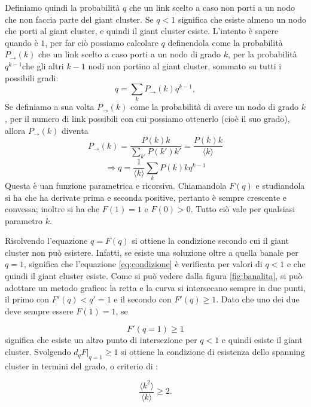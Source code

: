 Definiamo quindi la probabilit\`a $q$ che un link scelto a caso non porti a un nodo che non faccia parte del giant cluster. Se $q<1$ significa che esiste almeno un nodo che porti al giant cluster, e quindi il giant cluster esiste. L'intento \`e sapere quando \`e $1$, per far ci\`o possiamo calcolare $q$ definendola come la probabilit\`a $P_{\rightarrow}(k)$ che un link scelto a caso porti a un nodo di grado $k$, per la probabilit\`a $q^{k-1}$che gli altri $k-1$ nodi non portino al giant cluster, sommato su tutti i possibili gradi:
\begin{equation}
\label{eq:condizione}
	q = \sum_k P_{\rightarrow}(k) q^{k-1},
\end{equation}
Se definiamo a sua volta $P_{\rightarrow}(k)$ come la probabilit\`a di avere un nodo di grado $k$, per il numero di link possibili con cui possiamo ottenerlo (cio\`e il suo grado), allora $P_{\rightarrow}(k)$ diventa
\[P_{\rightarrow}(k) = \frac{P(k)k}{\sum_{k'}P(k')k'} = \frac{P(k)k}{\langle k \rangle}\]
\[\Rightarrow q = \frac{1}{\langle k \rangle}\sum_k P(k)kq^{k-1} \]
Questa \`e uan funzione parametrica e ricorsiva. Chiamandola $F(q)$ e studiandola si ha che ha derivate prima e seconda positive, pertanto \`e sempre crescente e convessa; inoltre si ha che $F(1) = 1$ e $F(0)>0$. Tutto ci\`o vale per qualsiasi parametro $k$. 

Risolvendo l'equazione $q = F(q)$ si ottiene la condizione secondo cui il giant cluster non pu\`o esistere. Infatti, se esiste una soluzione oltre a quella banale per $q=1$, significa che l'equazione \ref{eq:condizione} \`e verificata per valori di $q<1$ e che quindi il giant cluster esiste. Come si pu\`o vedere dalla figura \ref{fig:banalita}, si pu\`o adottare un metodo grafico: la retta e la curva si intersecano sempre in due punti, il primo con $F'(q)<q'=1$ e il secondo con $F'(q) \geq 1$. Dato che uno dei due deve sempre essere $F(1)=1$, se 

\begin{equation}
\label{eq:soluzione}
	F'(q=1) \geq 1 
\end{equation}
significa che esiste un altro punto di intersezione per $q<1$ e quindi esiste il giant cluster.
Svolgendo $d_qF|_{q=1} \geq 1$ si ottiene la condizione di esistenza dello spanning cluster in termini del grado, o criterio di \textcite{Molloy1995}:

\begin{equation}
\label{eq:criterion}
	\frac{\langle k^2\rangle}{\langle k \rangle}\geq 2.
\end{equation}

